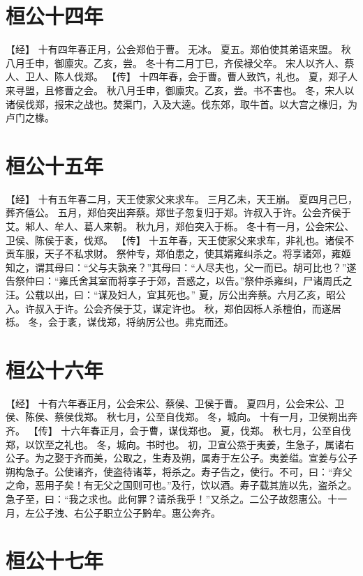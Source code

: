 \documentclass[a4paper,12pt,UTF8,twoside]{ctexbook}
\begin{document}
\section{桓公十四年}

【经】
十有四年春正月，公会郑伯于曹。
无冰。
夏五。郑伯使其弟语来盟。
秋八月壬申，御廪灾。乙亥，尝。
冬十有二月丁巳，齐侯禄父卒。
宋人以齐人、蔡人、卫人、陈人伐郑。
【传】
十四年春，会于曹。曹人致饩，礼也。
夏，郑子人来寻盟，且修曹之会。
秋八月壬申，御廪灾。乙亥，尝。书不害也。
冬，宋人以诸侯伐郑，报宋之战也。焚渠门，入及大逵。伐东郊，取牛首。以大宫之椽归，为卢门之椽。

\section{桓公十五年}

【经】
十有五年春二月，天王使家父来求车。
三月乙未，天王崩。
夏四月己巳，葬齐僖公。
五月，郑伯突出奔蔡。郑世子忽复归于郑。许叔入于许。公会齐侯于艾。邾人、牟人、葛人来朝。
秋九月，郑伯突入于栎。
冬十有一月，公会宋公、卫侯、陈侯于袲，伐郑。
【传】
十五年春，天王使家父来求车，非礼也。诸侯不贡车服，天子不私求财。
祭仲专，郑伯患之，使其婿雍纠杀之。将享诸郊，雍姬知之，谓其母曰：“父与夫孰亲？”其母曰：“人尽夫也，父一而已。胡可比也？”遂告祭仲曰：“雍氏舍其室而将享子于郊，吾惑之，以告。”祭仲杀雍纠，尸诸周氏之汪。公载以出，曰：“谋及妇人，宜其死也。”
夏，厉公出奔蔡。六月乙亥，昭公入。许叔入于许。公会齐侯于艾，谋定许也。
秋，郑伯因栎人杀檀伯，而遂居栎。
冬，会于袲，谋伐郑，将纳厉公也。弗克而还。

\section{桓公十六年}

【经】
十有六年春正月，公会宋公、蔡侯、卫侯于曹。
夏四月，公会宋公、卫侯、陈侯、蔡侯伐郑。
秋七月，公至自伐郑。
冬，城向。
十有一月，卫侯朔出奔齐。
【传】
十六年春正月，会于曹，谋伐郑也。
夏，伐郑。
秋七月，公至自伐郑，以饮至之礼也。
冬，城向。书时也。
初，卫宣公烝于夷姜，生急子，属诸右公子。为之娶于齐而美，公取之，生寿及朔，属寿于左公子。夷姜缢。宣姜与公子朔构急子。公使诸齐，使盗待诸莘，将杀之。寿子告之，使行。不可，曰：“弃父之命，恶用子矣！有无父之国则可也。”及行，饮以酒。寿子载其旌以先，盗杀之。急子至，曰：“我之求也。此何罪？请杀我乎！”又杀之。二公子故怨惠公。十一月，左公子洩、右公子职立公子黔牟。惠公奔齐。

\section{桓公十七年}
\end{document}
